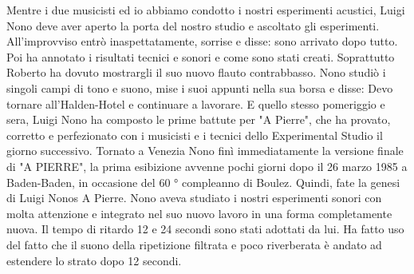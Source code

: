 Mentre i due musicisti ed io abbiamo condotto i nostri esperimenti acustici, Luigi Nono deve aver aperto la porta del nostro studio e ascoltato gli esperimenti. All'improvviso entrò inaspettatamente, sorrise e disse: sono arrivato dopo tutto. 
Poi ha annotato i risultati tecnici e sonori e come sono stati creati. Soprattutto Roberto ha dovuto mostrargli il suo nuovo flauto contrabbasso. Nono studiò i singoli campi di tono e suono, mise i suoi appunti nella sua borsa e disse: Devo tornare all'Halden-Hotel e continuare a lavorare. E quello stesso pomeriggio e sera, Luigi Nono ha composto le prime battute per "A Pierre", che ha provato, corretto e perfezionato con i musicisti e i tecnici dello Experimental Studio il giorno successivo. 
Tornato a Venezia Nono finì immediatamente la versione finale di "A PIERRE", la prima esibizione avvenne pochi giorni dopo il 26 marzo 1985 a Baden-Baden, in occasione del 60 ° compleanno di Boulez. 
Quindi, fate la genesi di Luigi Nonos A Pierre. Nono aveva studiato i nostri esperimenti sonori con molta attenzione e integrato nel suo nuovo lavoro in una forma completamente nuova. Il tempo di ritardo 12 e 24 secondi sono stati adottati da lui. Ha fatto uso del fatto che il suono della ripetizione filtrata e poco riverberata è andato ad estendere lo strato dopo 12 secondi. 


